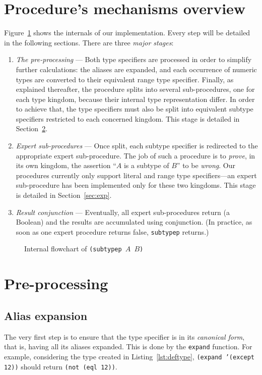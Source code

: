 \documentclass[format=sigconf]{acmart}
\newcommand\code[2][\small]{\sloppy\texttt{#1#2}}
\theoremstyle{definition}
\begin{document}
\section{Procedure's mechanisms overview}
\label{sec:flow}
Figure~\ref{fig:flow} shows the internals of our implementation. Every step will
be detailed in the following sections. There are three \emph{major stages}:

\begin{enumerate}
\item \emph{The pre-processing} --- Both type specifiers are processed in order to
  simplify further calculations: the aliases are expanded, and each occurrence
  of numeric types are converted to their equivalent range type specifier.
  Finally, as explained thereafter, the procedure splits into several
  sub-procedures, one for each type kingdom, because their internal
  type representation differ. In order to achieve that, the type specifiers must
  also be split into equivalent subtype specifiers restricted to each concerned
  kingdom.
  This stage is detailed in Section~\ref{sec:pre}.
\item \emph{Expert sub-procedures} --- Once split, each subtype specifier is
  redirected to the appropriate expert sub-procedure. The job of such a procedure is to
  \emph{prove}, in its own kingdom, the assertion ``$A$ is a subtype of $B$'' to
  be \emph{wrong}.
  Our procedures currently only support literal and range type specifiers---an
  expert sub-procedure has been implemented only for these two kingdoms. This
  stage is detailed in Section~\ref{sec:exp}.
\item \emph{Result conjunction} --- Eventually, all expert sub-procedures
  return (a Boolean) and the results are accumulated using conjunction.
  (In practice, as soon as one expert procedure returns false, \code{subtypep}
  returns.)
\end{enumerate}

\begin{figure}
  \centering
  
  \caption{Internal flowchart of \code{(subtypep $A$ $B$)}}
  \label{fig:flow}
\end{figure}

\section{Pre-processing}
\label{sec:pre}
\subsection{Alias expansion}
The very first step is to ensure that the type specifier is in its
\emph{canonical form}, that is, having all its aliases expanded. This is done by
the \code{expand} function. For example, considering the type created in
Listing~\ref{lst:deftype}, \code{(expand '(except 12))} should return \code{(not
  (eql 12))}.
\end{document}
